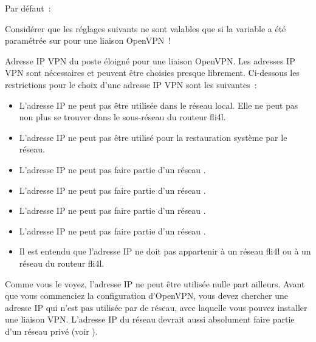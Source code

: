 \begin{description}


  Par défaut~: 

  Considérer que les réglages suivants ne sont valables que si la variable
   a été paramétrée sur 
  pour une liaison OpenVPN~!

  Adresse IP VPN du poste éloigné pour une liaison OpenVPN. Les adresses IP VPN
  sont nécessaires et peuvent être choisies presque librement. Ci-dessous les
  restrictions pour le choix d'une adresse IP VPN sont les suivantes~:

\begin{itemize}

\item L'adresse IP ne peut pas être utilisée dans le réseau local. Elle ne peut
  pas non plus se trouver dans le sous-réseau du routeur fli4l.

\item L'adresse IP ne peut pas être utilisé pour la restauration système par le réseau.

\item L'adresse IP ne peut pas faire partie d'un réseau .

\item L'adresse IP ne peut pas faire partie d'un réseau .

\item L'adresse IP ne peut pas faire partie d'un réseau .

\item L'adresse IP ne peut pas faire partie d'un réseau .

\item Il est entendu que l'adresse IP ne doit pas appartenir à un réseau fli4l
  ou à un réseau du routeur fli4l.

\end{itemize}

  Comme vous le voyez, l'adresse IP ne peut être utilisée nulle part ailleurs.
  Avant que vous commenciez la configuration d'OpenVPN, vous devez chercher une
  adresse IP qui n'est pas utilisée par de réseau, avec laquelle vous pouvez
  installer une liaison VPN. L'adresse IP du réseau devrait aussi absolument
  faire partie d'un réseau privé (voir ).


\end{description}
